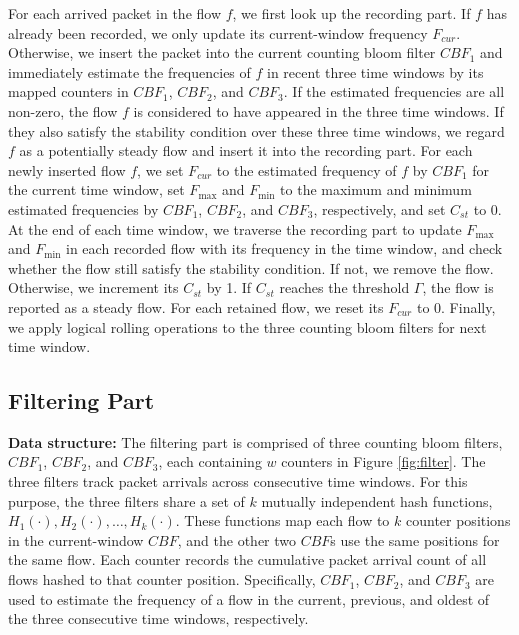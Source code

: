 \documentclass[preprint,12pt]{elsarticle}
\begin{document}
For each arrived packet in the flow $f$, we first look up the recording part. If $f$ has already been recorded, we only update its current-window frequency $F_{cur}$. Otherwise, we insert the packet into the current counting bloom filter $CBF_1$ and immediately estimate the frequencies of $f$ in recent three time windows by its mapped counters in $CBF_1$, $CBF_2$, and $CBF_3$. If the estimated frequencies are all non-zero, the flow $f$ is considered to have appeared in the three time windows. If they also satisfy the stability condition over these three time windows, we regard $f$ as a potentially steady flow and insert it into the recording part. For each newly inserted flow $f$, we set $F_{cur}$ to the estimated frequency of $f$ by $CBF_1$ for the current time window, set $F_{\max}$ and $F_{\min}$ to the maximum and minimum estimated frequencies by $CBF_1$, $CBF_2$, and $CBF_3$, respectively, and set $C_{st}$ to 0. At the end of each time window, we traverse the recording part to update $F_{\max}$ and $F_{\min}$ in each recorded flow with its frequency in the time window, and check whether the flow still satisfy the stability condition. If not, we remove the flow. Otherwise, we increment its $C_{st}$ by 1. If $C_{st}$ reaches the threshold $\Gamma$, the flow is reported as a steady flow. For each retained flow, we reset its $F_{cur}$ to 0. Finally, we apply logical rolling operations to the three counting bloom filters for next time window.

\subsection{Filtering Part}

\textbf{Data structure:} The filtering part is comprised of three counting bloom filters, $CBF_1$, $CBF_2$, and $CBF_3$, each containing $w$ counters in Figure \ref{fig:filter}. The three filters track packet arrivals across consecutive time windows. For this purpose, the three filters share a set of $k$ mutually independent hash functions, $H_1(\cdot), H_2(\cdot), \ldots, H_k(\cdot)$. These functions map each flow to $k$ counter positions in the current-window $CBF$, and the other two $CBF$s use the same positions for the same flow. Each counter records the cumulative packet arrival count of all flows hashed to that counter position. Specifically, $CBF_1$, $CBF_2$, and $CBF_3$ are used to estimate the frequency of a flow in the current, previous, and oldest of the three consecutive time windows, respectively.
 
\end{document}

